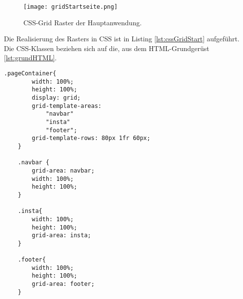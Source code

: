 \begin{figure}[!htb]
    \centering
    \texttt{[image: gridStartseite.png]}
    \caption{CSS-Grid Raster der Hauptanwendung.}
    \label{img:gridRaster}
\end{figure}

Die Realisierung des Rasters in CSS ist in Listing \ref{lst:cssGridStart} aufgeführt. Die CSS-Klassen beziehen sich auf die, aus dem HTML-Grundgerüst \ref{lst:grundHTML}.

\begin{lstlisting}[caption={Realisierung des Grid-Rasters in CSS}, label={lst:cssGridStart}, float=!htb]
    .pageContainer{
        width: 100%;
        height: 100%;
        display: grid;
        grid-template-areas:
            "navbar"
            "insta"
            "footer";
        grid-template-rows: 80px 1fr 60px;
    }

    .navbar {
        grid-area: navbar;
        width: 100%;
        height: 100%;
    }

    .insta{
        width: 100%;
        height: 100%;
        grid-area: insta;
    }

    .footer{
        width: 100%;
        height: 100%;
        grid-area: footer;
    }
\end{lstlisting}

